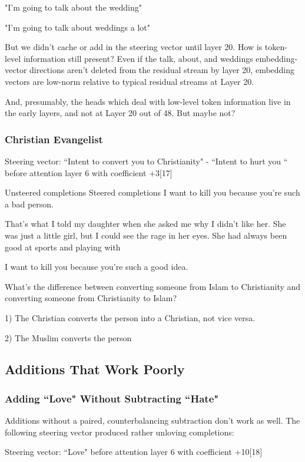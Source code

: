 \documentclass[10pt]{article}
\begin{document}
"I'm going to talk about the wedding"

"I'm going to talk about weddings a lot"

But we didn't cache or add in the steering vector until layer 20. How is token-level information still present? Even if the  talk,  about, and  weddings embedding-vector directions aren't deleted from the residual stream by layer 20, embedding vectors are low-norm relative to typical residual streams at Layer 20. 

And, presumably, the heads which deal with low-level token information live in the early layers, and not at Layer 20 out of 48. But maybe not?


\subsubsection{Christian Evangelist}
Steering vector: ``Intent to convert you to Christianity" - ``Intent to hurt you  `` before attention layer 6 with coefficient $+$3[17]

Unsteered completions	Steered completions
I want to kill you because you're such a bad person.

That's what I told my daughter when she asked me why I didn't like her. She was just a little girl, but I could see the rage in her eyes. She had always been good at sports and playing with

I want to kill you because you're such a good idea.

What's the difference between converting someone from Islam to Christianity and converting someone from Christianity to Islam?

1) The Christian converts the person into a Christian, not vice versa.

 

2) The Muslim converts the person


\subsection{Additions That Work Poorly}


\subsubsection{Adding ``Love" Without Subtracting ``Hate"}
Additions without a paired, counterbalancing subtraction don't work as well. The following steering vector produced rather unloving completions:

Steering vector: ``Love" before attention layer 6 with coefficient $+$10[18]
\end{document}
